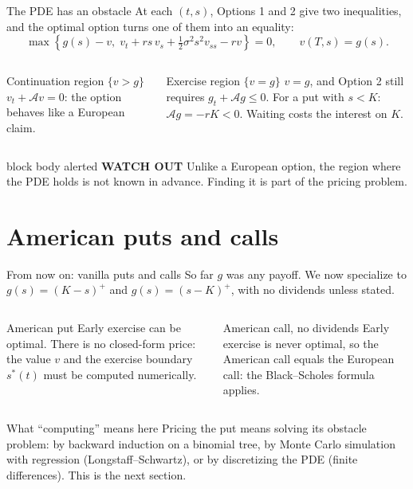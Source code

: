 \documentclass[handout,10pt,aspectratio=169]{beamer}
\newenvironment{simplificationbox}{\begin{beamercolorbox}[rounded=true,sep=0.7em,wd=\textwidth]{block body alerted}
  \textbf{\color{CourseRed}WATCH OUT}\quad}{\end{beamercolorbox}}
\begin{document}
\begin{frame}{The PDE has an obstacle}
At each \((t,s)\), Options 1 and 2 give two inequalities, and the optimal
option turns one of them into an equality:
\[
\boxed{\max\left\{g(s)-v,\;
v_t+rs\,v_s+\tfrac12\sigma^2s^2v_{ss}-rv\right\}=0,
\qquad v(T,s)=g(s).}
\]
\begin{columns}[T,onlytextwidth]
\begin{block}{Continuation region \(\{v>g\}\)}
\(v_t+\mathcal Av=0\): the option behaves like a European claim.
\end{block}
\begin{exampleblock}{Exercise region \(\{v=g\}\)}
\(v=g\), and Option 2 still requires \(g_t+\mathcal Ag\leq0\).
For a put with \(s<K\): \(\mathcal Ag=-rK<0\). Waiting costs the
interest on \(K\).
\end{exampleblock}
\end{columns}
\begin{simplificationbox}
Unlike a European option, the region where the PDE holds is not known in
advance. Finding it is part of the pricing problem.
\end{simplificationbox}
\end{frame}

\section{American puts and calls}

\begin{frame}{From now on: vanilla puts and calls}
So far \(g\) was any payoff. We now specialize to
\(g(s)=(K-s)^+\) and \(g(s)=(s-K)^+\), with no dividends unless stated.
\begin{columns}[T,onlytextwidth]
\begin{block}{American put}
Early exercise can be optimal. There is no closed-form price: the value
\(v\) and the exercise boundary \(s^*(t)\) must be computed numerically.
\end{block}
\begin{exampleblock}{American call, no dividends}
Early exercise is never optimal, so the American call equals the European
call: the Black--Scholes formula applies.
\end{exampleblock}
\end{columns}
\begin{block}{What ``computing'' means here}
Pricing the put means solving its obstacle problem: by backward induction on
a binomial tree, by Monte Carlo simulation with regression
(Longstaff--Schwartz), or by discretizing the PDE (finite differences). This
is the next section.
\end{block}
\end{frame}
\end{document}
